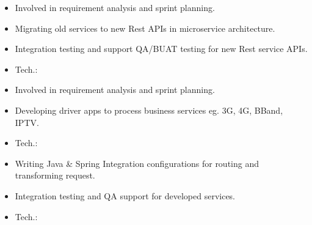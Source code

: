 \documentclass[9pt,a4paper,ragged2e,withhyper]{altacv}
\begin{document}
\begin{paracol}{2}
\divider

\begin{itemize}
\item Involved in requirement analysis and sprint planning.
\item Migrating old services to new Rest APIs in microservice architecture.
\item Integration testing and support QA/BUAT testing for new Rest service APIs.
\item Tech.:    
\end{itemize}

\divider

\begin{itemize}
  \item Involved in requirement analysis and sprint planning.
  \item Developing driver apps to process business services eg. 3G, 4G, BBand, IPTV.
  \item Tech.:    
\end{itemize}

\divider

\begin{itemize}
  \item Writing Java \& Spring Integration configurations for routing and transforming request.
  \item Integration testing and QA support for developed services.
\item Tech.:     
\end{itemize}






\end{paracol}
\end{document}
